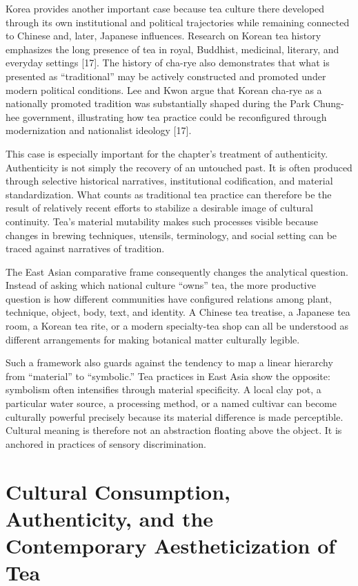 \documentclass[11pt,a4paper]{article}
\begin{document}
Korea provides another important case because tea culture there developed through its own institutional and political trajectories while remaining connected to Chinese and, later, Japanese influences. Research on Korean tea history emphasizes the long presence of tea in royal, Buddhist, medicinal, literary, and everyday settings [17]. The history of cha-rye also demonstrates that what is presented as ``traditional'' may be actively constructed and promoted under modern political conditions. Lee and Kwon argue that Korean cha-rye as a nationally promoted tradition was substantially shaped during the Park Chung-hee government, illustrating how tea practice could be reconfigured through modernization and nationalist ideology [17].

This case is especially important for the chapter's treatment of authenticity. Authenticity is not simply the recovery of an untouched past. It is often produced through selective historical narratives, institutional codification, and material standardization. What counts as traditional tea practice can therefore be the result of relatively recent efforts to stabilize a desirable image of cultural continuity. Tea's material mutability makes such processes visible because changes in brewing techniques, utensils, terminology, and social setting can be traced against narratives of tradition.

The East Asian comparative frame consequently changes the analytical question. Instead of asking which national culture ``owns'' tea, the more productive question is how different communities have configured relations among plant, technique, object, body, text, and identity. A Chinese tea treatise, a Japanese tea room, a Korean tea rite, or a modern specialty-tea shop can all be understood as different arrangements for making botanical matter culturally legible.

Such a framework also guards against the tendency to map a linear hierarchy from ``material'' to ``symbolic.'' Tea practices in East Asia show the opposite: symbolism often intensifies through material specificity. A local clay pot, a particular water source, a processing method, or a named cultivar can become culturally powerful precisely because its material difference is made perceptible. Cultural meaning is therefore not an abstraction floating above the object. It is anchored in practices of sensory discrimination.

\section{Cultural Consumption, Authenticity, and the Contemporary Aestheticization of Tea}
\end{document}

